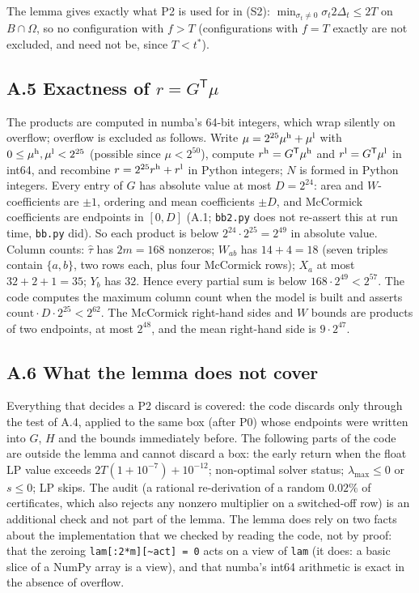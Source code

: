 \documentclass[11pt]{amsart}
\theoremstyle{definition}
\newcommand{\tstar}{t^{*}}
\begin{document}
The lemma gives exactly what P2 is used for in (S2): $\min_{\sigma_t\ne0}\sigma_t 2\Delta_t \le 2T$ on $B\cap\Omega$, so no configuration with $f > T$ (configurations with $f = T$ exactly are not excluded, and need not be, since $T < \tstar$).

\subsection*{\texorpdfstring{A.5 Exactness of $r = G^{\mathsf T}\mu$}{A.5 Exactness of r}}
The products are computed in numba's 64-bit integers, which wrap silently on overflow; overflow is excluded as follows. Write $\mu = 2^{25}\mu^{\rm h} + \mu^{\rm l}$ with $0 \le \mu^{\rm h}, \mu^{\rm l} < 2^{25}$ (possible since $\mu < 2^{50}$), compute $r^{\rm h} = G^{\mathsf T}\mu^{\rm h}$ and $r^{\rm l} = G^{\mathsf T}\mu^{\rm l}$ in int64, and recombine $r = 2^{25}r^{\rm h} + r^{\rm l}$ in Python integers; $N$ is formed in Python integers. Every entry of $G$ has absolute value at most $D = 2^{24}$: area and $W$-coefficients are $\pm1$, ordering and mean coefficients $\pm D$, and McCormick coefficients are endpoints in $[0,D]$ (A.1; \texttt{bb2.py} does not re-assert this at run time, \texttt{bb.py} did). So each product is below $2^{24}\cdot2^{25} = 2^{49}$ in absolute value. Column counts: $\hat\tau$ has $2m = 168$ nonzeros; $W_{ab}$ has $14 + 4 = 18$ (seven triples contain $\{a,b\}$, two rows each, plus four McCormick rows); $X_a$ at most $32 + 2 + 1 = 35$; $Y_b$ has $32$. Hence every partial sum is below $168\cdot2^{49} < 2^{57}$. The code computes the maximum column count when the model is built and asserts $\text{count}\cdot D\cdot2^{25} < 2^{62}$. The McCormick right-hand sides and $W$ bounds are products of two endpoints, at most $2^{48}$, and the mean right-hand side is $9\cdot2^{47}$.

\subsection*{A.6 What the lemma does not cover}
Everything that decides a P2 discard is covered: the code discards only through the test of A.4, applied to the same box (after P0) whose endpoints were written into $G$, $H$ and the bounds immediately before. The following parts of the code are outside the lemma and cannot discard a box: the early return when the float LP value exceeds $2T(1+10^{-7})+10^{-12}$; non-optimal solver status; $\lambda_{\max} \le 0$ or $s \le 0$; LP skips. The audit (a rational re-derivation of a random $0.02\%$ of certificates, which also rejects any nonzero multiplier on a switched-off row) is an additional check and not part of the lemma. The lemma does rely on two facts about the implementation that we checked by reading the code, not by proof: that the zeroing \texttt{lam[:2*m][\textasciitilde act] = 0} acts on a view of \texttt{lam} (it does: a basic slice of a NumPy array is a view), and that numba's int64 arithmetic is exact in the absence of overflow.
\end{document}
